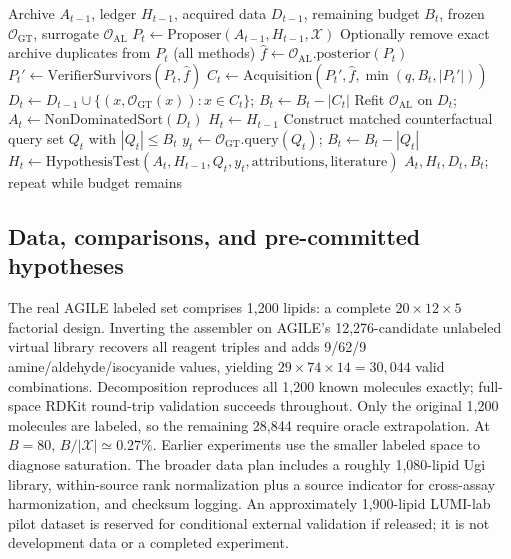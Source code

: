 \documentclass{article}
\begin{document}
\begin{algorithm}[t]
\caption{Budget-accounted LEAF round}
\label{alg:leaf}
\begin{algorithmic}[1]
\Require Archive $A_{t-1}$, ledger $H_{t-1}$, acquired data $D_{t-1}$, remaining budget $B_t$, frozen $\mathcal O_{\mathrm{GT}}$, surrogate $\mathcal O_{\mathrm{AL}}$
\State $P_t\gets\mathrm{Proposer}(A_{t-1},H_{t-1},\mathcal X)$
\State Optionally remove exact archive duplicates from $P_t$ (all methods)
\State $\hat f\gets\mathcal O_{\mathrm{AL}}.\mathrm{posterior}(P_t)$
\State $P_t'\gets\mathrm{VerifierSurvivors}(P_t,\hat f)$
\State $C_t\gets\mathrm{Acquisition}(P_t',\hat f,\min(q,B_t,|P_t'|))$
\State $D_t\gets D_{t-1}\cup\{(x,\mathcal O_{\mathrm{GT}}(x)):x\in C_t\}$; $B_t\gets B_t-|C_t|$
\State Refit $\mathcal O_{\mathrm{AL}}$ on $D_t$; $A_t\gets\mathrm{NonDominatedSort}(D_t)$
\State $H_t\gets H_{t-1}$
\State Construct matched counterfactual query set $Q_t$ with $|Q_t|\le B_t$
\State $y_t\gets\mathcal O_{\mathrm{GT}}.\mathrm{query}(Q_t)$; $B_t\gets B_t-|Q_t|$
\State $H_t\gets\mathrm{HypothesisTest}(A_t,H_{t-1},Q_t,y_t,\text{attributions},\text{literature})$
\EndIf
\State \Return $A_t,H_t,D_t,B_t$; repeat while budget remains
\end{algorithmic}
\end{algorithm}

\subsection{Data, comparisons, and pre-committed hypotheses}
The real AGILE labeled set comprises 1,200 lipids: a complete $20\times12\times5$ factorial design. Inverting the assembler on AGILE's 12,276-candidate unlabeled virtual library recovers all reagent triples and adds 9/62/9 amine/aldehyde/isocyanide values, yielding $29\times74\times14=30{,}044$ valid combinations. Decomposition reproduces all 1,200 known molecules exactly; full-space RDKit round-trip validation succeeds throughout. Only the original 1,200 molecules are labeled, so the remaining 28,844 require oracle extrapolation. At $B=80$, $B/|\mathcal X|\simeq0.27\%$. Earlier experiments use the smaller labeled space to diagnose saturation. The broader data plan includes a roughly 1,080-lipid Ugi library, within-source rank normalization plus a source indicator for cross-assay harmonization, and checksum logging. An approximately 1,900-lipid LUMI-lab pilot dataset is reserved for conditional external validation if released; it is not development data or a completed experiment.
\end{document}
